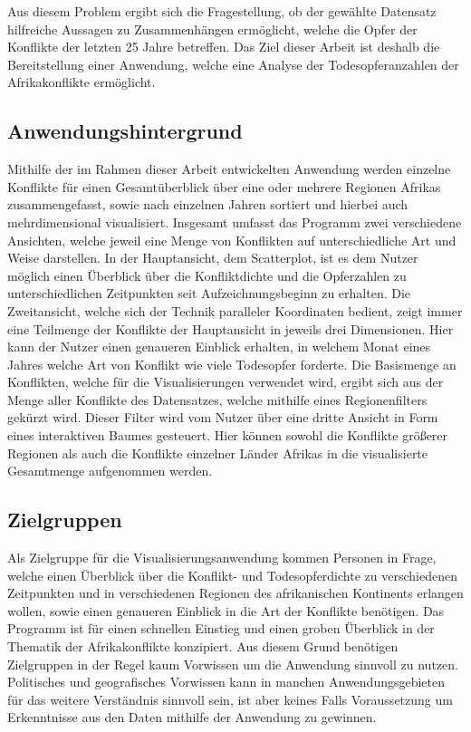\documentclass[usegeometry=true]{scrartcl}
\begin{document}
Aus diesem Problem ergibt sich die Fragestellung, ob der gewählte Datensatz hilfreiche Aussagen zu Zusammenhängen ermöglicht, welche die Opfer der Konflikte der letzten 25 Jahre betreffen. Das Ziel dieser Arbeit ist deshalb die Bereitstellung einer Anwendung, welche eine Analyse der Todesopferanzahlen der Afrikakonflikte ermöglicht.

\subsection{Anwendungshintergrund}
Mithilfe der im Rahmen dieser Arbeit entwickelten Anwendung werden einzelne Konflikte für einen Gesamtüberblick über eine oder mehrere Regionen Afrikas zusammengefasst, sowie nach einzelnen Jahren sortiert und hierbei auch mehrdimensional visualisiert. Insgesamt umfasst das Programm zwei verschiedene Ansichten, welche jeweil eine Menge von Konflikten auf unterschiedliche Art und Weise darstellen. In der Hauptansicht, dem Scatterplot, ist es dem Nutzer möglich einen Überblick über die Konfliktdichte und die Opferzahlen zu unterschiedlichen Zeitpunkten seit Aufzeichnungsbeginn zu erhalten. Die Zweitansicht, welche sich der Technik paralleler Koordinaten bedient, zeigt immer eine Teilmenge der Konflikte der Hauptansicht in jeweils drei Dimensionen. Hier kann der Nutzer einen genaueren Einblick erhalten, in welchem Monat eines Jahres welche Art von Konflikt wie viele Todesopfer forderte. Die Basismenge an Konflikten, welche für die Visualisierungen verwendet wird, ergibt sich aus der Menge aller Konflikte des Datensatzes, welche mithilfe eines Regionenfilters gekürzt wird. Dieser Filter wird vom Nutzer über eine dritte Ansicht in Form eines interaktiven Baumes gesteuert. Hier können sowohl die Konflikte größerer Regionen als auch die Konflikte einzelner Länder Afrikas in die visualisierte Gesamtmenge aufgenommen werden.
\subsection{Zielgruppen}
Als Zielgruppe für die Visualisierungsanwendung kommen Personen in Frage, welche einen Überblick über die Konflikt- und Todesopferdichte zu verschiedenen Zeitpunkten und in verschiedenen Regionen des afrikanischen Kontinents erlangen wollen, sowie einen genaueren Einblick in die Art der Konflikte benötigen. Das Programm ist für einen schnellen Einstieg und einen groben Überblick in der Thematik der Afrikakonflikte konzipiert. Aus diesem Grund benötigen Zielgruppen in der Regel kaum Vorwissen um die Anwendung sinnvoll zu nutzen. Politisches und geografisches Vorwissen kann in manchen Anwendungsgebieten für das weitere Verständnis sinnvoll sein, ist aber keines Falls Voraussetzung um Erkenntnisse aus den Daten mithilfe der Anwendung zu gewinnen.\\
\end{document}
